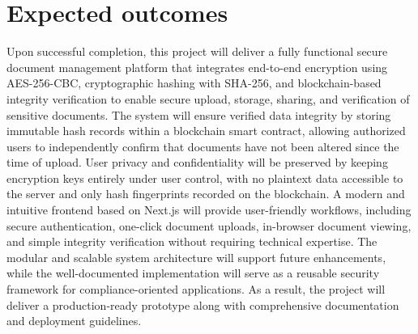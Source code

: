 \documentclass[12pt]{article}
\begin{document}
\section{Expected outcomes}
Upon successful completion, this project will deliver a fully functional secure document management platform that integrates end-to-end encryption using AES-256-CBC, cryptographic hashing with SHA-256, and blockchain-based integrity verification to enable secure upload, storage, sharing, and verification of sensitive documents. The system will ensure verified data integrity by storing immutable hash records within a blockchain smart contract, allowing authorized users to independently confirm that documents have not been altered since the time of upload. User privacy and confidentiality will be preserved by keeping encryption keys entirely under user control, with no plaintext data accessible to the server and only hash fingerprints recorded on the blockchain. A modern and intuitive frontend based on Next.js will provide user-friendly workflows, including secure authentication, one-click document uploads, in-browser document viewing, and simple integrity verification without requiring technical expertise. The modular and scalable system architecture will support future enhancements, while the well-documented implementation will serve as a reusable security framework for compliance-oriented applications. As a result, the project will deliver a production-ready prototype along with comprehensive documentation and deployment guidelines.

\newpage


\end{document}
